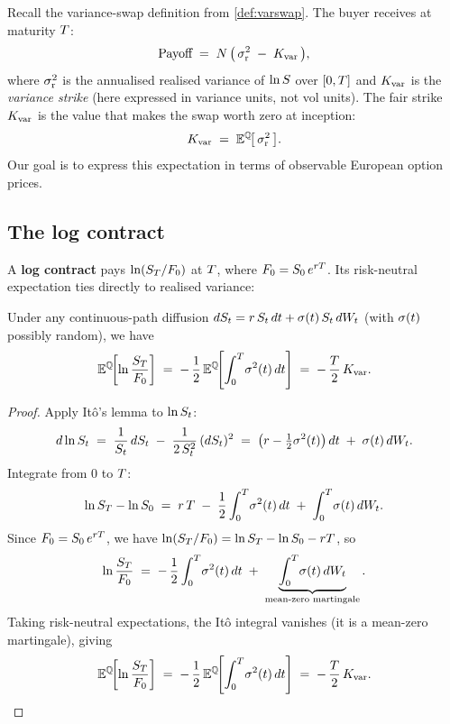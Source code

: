 Recall the variance-swap definition from \cref{def:varswap}.  The
buyer receives at maturity $T$:
\[
  \text{Payoff}
  \;=\;
  N \,\bigl(\,\sigma_{\text{r}}^2 \;-\; K_{\text{var}}\,\bigr),
\]
where $\sigma_{\text{r}}^2$ is the annualised realised variance of
$\ln S$ over $[0,T]$ and $K_{\text{var}}$ is the
\emph{variance strike} (here expressed in variance units, not vol
units).  The fair strike $K_{\text{var}}$ is the value that
makes the swap worth zero at inception:
\begin{equation}
  K_{\text{var}}
  \;=\;
  \mathbb{E}^{\mathbb{Q}}\!\bigl[\,\sigma_{\text{r}}^2\,\bigr].
  \label{eq:varswap_fair_strike}
\end{equation}
Our goal is to express this expectation in terms of observable European
option prices.

\subsection{The log contract}
\label{subsec:log_contract}

A \textbf{log contract} pays $\ln(S_T/F_0)$ at $T$, where
$F_0=S_0\,e^{rT}$. Its risk-neutral expectation ties directly
to realised variance:

\begin{lemma}
\label{lem:log_contract}
Under any continuous-path diffusion
$dS_t = r\,S_t\,dt + \sigma(t)\,S_t\,dW_t$
(with $\sigma(t)$ possibly random), we have
\begin{equation}
  \mathbb{E}^{\mathbb{Q}}\!\!\left[\ln\frac{S_T}{F_0}\right]
  \;=\;
  -\,\frac{1}{2}\,\mathbb{E}^{\mathbb{Q}}\!\!\left[
    \int_0^{T}\!\sigma^2(t)\,dt
  \right]
  \;=\;
  -\,\frac{T}{2}\,K_{\text{var}}.
  \label{eq:log_contract_expectation}
\end{equation}
\end{lemma}

\begin{proof}
Apply It\^o's lemma to $\ln S_t$:
\[
  d\ln S_t
  \;=\;
  \frac{1}{S_t}\,dS_t
  \;-\;
  \frac{1}{2\,S_t^2}\,(dS_t)^2
  \;=\;
  \left(r - \tfrac{1}{2}\sigma^2(t)\right)dt
  \;+\;
  \sigma(t)\,dW_t.
\]
Integrate from $0$ to $T$:
\[
  \ln S_T - \ln S_0
  \;=\;
  r\,T
  \;-\;
  \frac{1}{2}\int_0^{T}\!\sigma^2(t)\,dt
  \;+\;
  \int_0^{T}\!\sigma(t)\,dW_t.
\]
Since $F_0 = S_0\,e^{rT}$, we have
$\ln(S_T / F_0) = \ln S_T - \ln S_0 - rT$,
so
\[
  \ln\frac{S_T}{F_0}
  \;=\;
  -\,\frac{1}{2}\int_0^{T}\!\sigma^2(t)\,dt
  \;+\;
  \underbrace{\int_0^{T}\!\sigma(t)\,dW_t}_{\text{mean-zero martingale}}.
\]
Taking risk-neutral expectations, the It\^o integral vanishes (it is a
mean-zero martingale), giving
\[
  \mathbb{E}^{\mathbb{Q}}\!\!\left[\ln\frac{S_T}{F_0}\right]
  \;=\;
  -\,\frac{1}{2}\,\mathbb{E}^{\mathbb{Q}}\!\!\left[
    \int_0^{T}\!\sigma^2(t)\,dt
  \right]
  \;=\;
  -\,\frac{T}{2}\,K_{\text{var}}.
  \qedhere
\]
\end{proof}

